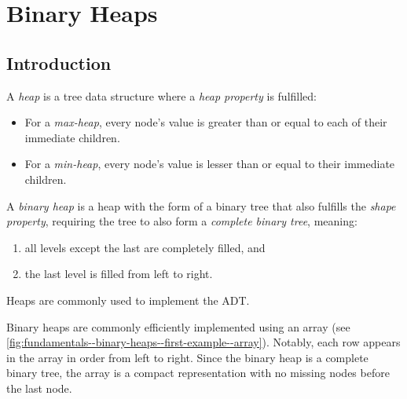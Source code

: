 \section{Binary Heaps}%
\label{sec:fundamentals--binary-heaps}

\subsection{Introduction}

A \emph{heap} is a tree data structure where a \emph{heap property} is fulfilled:
\begin{itemize}
    \item For a \emph{max-heap}, every node's value is greater than or equal to each of their immediate children.
    \item For a \emph{min-heap}, every node's value is lesser than or equal to their immediate children.
\end{itemize}

A \emph{binary heap} is a heap with the form of a binary tree that also fulfills the \emph{shape property}, requiring the tree to also form a \emph{complete binary tree}, meaning:
\begin{enumerate}
    \item all levels except the last are completely filled, and
    \item the last level is filled from left to right.
\end{enumerate}

Heaps are commonly used to implement the  ADT.

Binary heaps are commonly efficiently implemented using an array (see \cref{fig:fundamentals--binary-heaps--first-example--array}). Notably, each row appears in the array in order from left to right. Since the binary heap is a complete binary tree, the array is a compact representation with no missing nodes before the last node.

